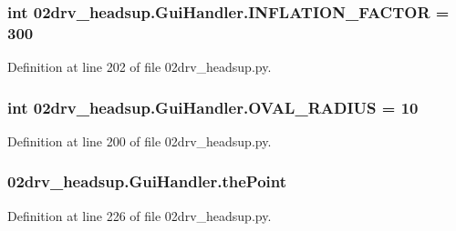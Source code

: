 \subsubsection[{\texorpdfstring{I\+N\+F\+L\+A\+T\+I\+O\+N\+\_\+\+F\+A\+C\+T\+OR}{INFLATION_FACTOR}}]{\setlength{\rightskip}{0pt plus 5cm}int 02drv\+\_\+headsup.\+Gui\+Handler.\+I\+N\+F\+L\+A\+T\+I\+O\+N\+\_\+\+F\+A\+C\+T\+OR = 300\hspace{0.3cm}{\ttfamily [static]}}\hypertarget{class02drv__headsup_1_1_gui_handler_a967f6b450051b9678fae359eedb1eca9}{}\label{class02drv__headsup_1_1_gui_handler_a967f6b450051b9678fae359eedb1eca9}


Definition at line 202 of file 02drv\+\_\+headsup.\+py.

\subsubsection[{\texorpdfstring{O\+V\+A\+L\+\_\+\+R\+A\+D\+I\+US}{OVAL_RADIUS}}]{\setlength{\rightskip}{0pt plus 5cm}int 02drv\+\_\+headsup.\+Gui\+Handler.\+O\+V\+A\+L\+\_\+\+R\+A\+D\+I\+US = 10\hspace{0.3cm}{\ttfamily [static]}}\hypertarget{class02drv__headsup_1_1_gui_handler_aa2a89d3ca5317eb67a66fe5b5cfc3992}{}\label{class02drv__headsup_1_1_gui_handler_aa2a89d3ca5317eb67a66fe5b5cfc3992}


Definition at line 200 of file 02drv\+\_\+headsup.\+py.

\subsubsection[{\texorpdfstring{the\+Point}{thePoint}}]{\setlength{\rightskip}{0pt plus 5cm}02drv\+\_\+headsup.\+Gui\+Handler.\+the\+Point}\hypertarget{class02drv__headsup_1_1_gui_handler_af714e8f325912960d90a36cee9156a46}{}\label{class02drv__headsup_1_1_gui_handler_af714e8f325912960d90a36cee9156a46}


Definition at line 226 of file 02drv\+\_\+headsup.\+py.

